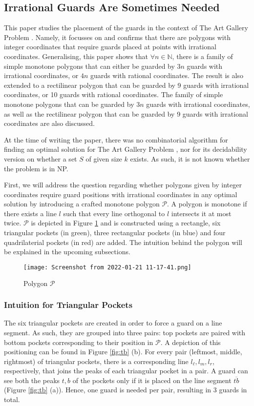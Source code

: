 \subsection{Irrational Guards Are Sometimes Needed \cite{abrahamsen2021art}}
This paper \cite{abrahamsen2021art} studies the placement of the guards in the context of The Art Gallery Problem \cite{o1987art}. Namely, it focusses on and confirms that there are polygons with integer coordinates that require guards placed at points with irrational coordinates. Generalising, this paper shows that $\forall n \in \mathbb N$, there is a family of simple monotone polygons that can either be guarded by $3n$ guards with irrational coordinates, or $4n$ guards with rational coordinates. The result is also extended to a rectilinear polygon that can be guarded by 9 guards with irrational coordinates, or 10 guards with rational coordinates. The family of simple monotone polygons that can be guarded by $3n$ guards with irrational coordinates, as well as the rectilinear polygon that can be guarded by 9 guards with irrational coordinates are also discussed.


At the time of writing the paper, there was no combinatorial algorithm for finding an optimal solution for The Art Gallery Problem \cite{o1987art}, nor for its decidability version on whether a set $S$ of given size $k$ exists. As such, it is not known whether the problem is in NP.

First, we will address the question regarding whether polygons given by integer coordinates require guard positions with irrational coordinates in any optimal solution by introducing a crafted monotone polygon $\mathcal P$. A polygon is monotone if there exists a line $l$ such that every line orthogonal to $l$ intersects it at most twice. $\mathcal P$ is depicted in Figure \ref{fig:p} and is constructed using a rectangle, six triangular pockets (in green), three rectangular pockets (in blue) and four quadrilaterial pockets (in red) are added. The intuition behind the polygon will be explained in the upcoming subsections.

\begin{figure}[h!]
    \centering
    \texttt{[image: Screenshot from 2022-01-21 11-17-41.png]}
    \caption{Polygon $\mathcal P$}
    \label{fig:p}
\end{figure}

\subsubsection{Intuition for Triangular Pockets}
The six triangular pockets are created in order to force a guard on a line segment. As such, they are grouped into three pairs: top pockets are paired with bottom pockets corresponding to their position in $\mathcal P$. A depiction of this positioning can be found in Figure \ref{fig:tb} (b). For every pair (leftmost, middle, rightmost) of triangular pockets, there is a corresponding line $l_\ell, l_m, l_r$, respectively, that joins the peaks of each triangular pocket in a pair. A guard can see both the peaks $t, b$ of the pockets only if it is placed on the line segment $\overline{tb}$ (Figure \ref{fig:tb} (a)). Hence, one guard is needed per pair, resulting in 3 guards in total.


